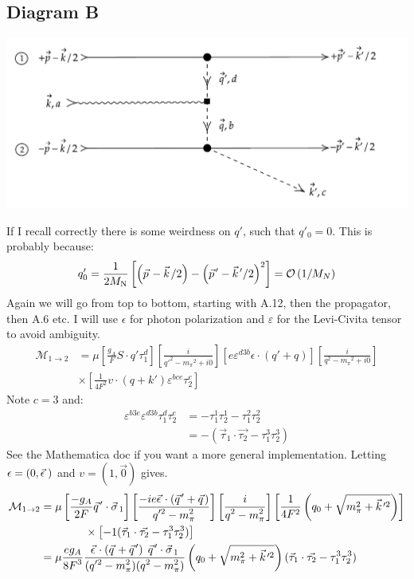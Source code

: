 \documentclass[11pt]{article}
\newcommand\ddfrac[2]{\frac{\displaystyle #1}{\displaystyle #2}}
\newcommand{\vectorwithspace}[1]{\vec{#1}\mkern2mu\vphantom{#1}}
\newcommand{\kv}{\vectorwithspace{k}}
\newcommand{\pv}{\vectorwithspace{p}}
\newcommand{\qv}{\vectorwithspace{q}}
\newcommand{\sigv}{\vectorwithspace{\sigma}}
\newcommand{\epsv}{\vectorwithspace{\epsilon}}
\newcommand{\mpi}{\ensuremath{m_\pi}}
\newcommand{\ga}{\ensuremath{g_A}}
\newcommand{\MN}{\ensuremath{M_\mathrm{N}}} %
\newcommand{\calM}{\mathcal{M}} \newcommand{\calN}{\mathcal{N}}
\newcommand{\calO}{\mathcal{O}} \newcommand{\calP}{\mathcal{P}}
\begin{document}
\subsection{Diagram B}
\begin{center}
	\includegraphics[scale=0.8]{2B-diagB.pdf}
\end{center}
If I recall correctly there is some weirdness on $q'$, such that $q'_0=0$.
This is probably because:
\begin{equation}
	q_0'=\frac{1}{2\MN}\left[ \left( \pv - \kv/2 \right)- \left( \pv' -\kv'/2 \right)^2\right] =\calO \left( 1/M_N \right)
\end{equation}
Again we will go from top to bottom, starting with A.12, then the
propagator, then A.6 etc. I will use $\epsilon$ for photon
polarization and $\varepsilon$ for the Levi-Civita tensor to avoid ambiguity.
\begin{align}
	\calM_{1\to2} & = \mu
	\left[ \frac{\ga}{F} S \cdot q' \tau_1^d\right]
	\left[ \ddfrac{i}{q'^2 -\mpi^2 +i0} \right]
	\left[ e \varepsilon^{d3b} \epsilon \cdot \left( q'+ q \right) \right]
	\left[ \ddfrac{i}{q^2 -\mpi^2+i0}  \right]\nonumber                        \\
	              & \times\left[ \frac{1}{4 F^2} v \cdot \left( q + k' \right)
		\varepsilon^{bce} \tau_2^e \right]
\end{align}
Note $c=3$ and:
\begin{align}
	\varepsilon^{b3e} \varepsilon^{d3b} \tau_1^d\tau_2^e & =
	-\tau_1^1\tau_2^1 - \tau_1^2 \tau_2^2                                                                          \\
	                                                     & = -(\vec{\tau}_1 \cdot \vec{\tau_2} -\tau_1^3 \tau_2^3)
\end{align}
See the Mathematica doc if you want a more general implementation.
Letting $\epsilon=(0,\epsv\,)$ and $v=(1,\vec{0})$ gives.
\begin{align}
	\calM_{1\to2} & = \mu
	\left[ \frac{-\ga}{2F} \qv'\cdot \sigv_1 \right]
	\left[ \ddfrac{-i e \epsv \cdot  \left(\qv' +\qv \right) }{q'^2-\mpi^2}  \right]
	\left[ \ddfrac{i}{q^2 -\mpi^2}  \right]
	\left[ \frac{1}{4 F^2}\left( q_0 + \sqrt{\mpi^2 +\kv'^2}\right) \right]                                \\
	              & \qquad\qquad\times \left[-1(\vec{\tau}_1 \cdot \vec{\tau_2} -\tau_1^3 \tau_2^3)\right] \\
	              & =\mu \ddfrac{e \ga }{8F^3}
	\ddfrac{
		\epsv \cdot \left( \qv+\qv' \right)\;
		\qv' \cdot  \sigv_1
	}{
		(q'^2-\mpi^2)
		(q^2 -\mpi^2)
	}
	\left( q_0 + \sqrt{\mpi^2 +\kv'^2}\right)
	(\vec{\tau}_1 \cdot \vec{\tau_2} -\tau_1^3 \tau_2^3)
\end{align}
\end{document}
